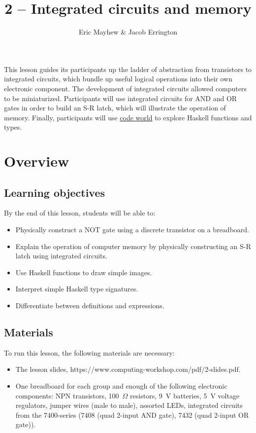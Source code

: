 \documentclass[11pt]{article}
\title{2 -- Integrated circuits and memory}
\author{Eric Mayhew \& Jacob Errington}
\date{}
\newcommand{\cwurl}{https://www.computing-workshop.com/}
\newcommand{\cwpdf}{\cwurl pdf/}
\newcommand{\codeworld}{\href{http://code.world/}{code world}}
\begin{document}
\maketitle

This lesson guides its participants up the ladder of abstraction from
transistors to integrated circuits, which bundle up useful logical operations
into their own electronic component. The development of integrated circuits
allowed computers to be miniaturized. Participants will use integrated circuits
for AND and OR gates in order to build an S-R latch, which will illustrate the
operation of memory. Finally, participants will use \codeworld{} to explore
Haskell functions and types.

\section*{Overview}

\subsection*{Learning objectives}

By the end of this lesson, students will be able to:
%
\begin{itemize}
\item Physically construct a NOT gate using a discrete transistor on a breadboard.
\item Explain the operation of computer memory by physically constructing an S-R
  latch using integrated circuits.
\item Use Haskell functions to draw simple images.
\item Interpret simple Haskell type signatures.
\item Differentiate between definitions and expressions.
\end{itemize}

\subsection*{Materials}

To run this lesson, the following materials are necessary:

\begin{itemize}
\item The lesson slides, \cwpdf{2-slides.pdf}.
\item One breadboard for each group and enough of the following electronic
  components:
  NPN transistors,
  100~$\Omega$ resistors,
  9~V batteries,
  5~V voltage regulators,
  jumper wires (male to male),
  assorted LEDs,
  integrated circuits from the 7400-series (7408 (quad 2-input AND gate), 7432
  (quad 2-input OR gate)).
\end{itemize}
\end{document}
